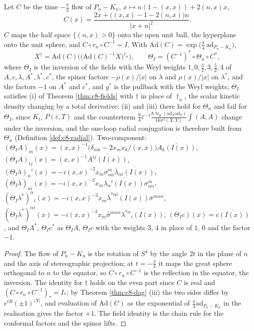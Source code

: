 \begin{proposition}
\label{prop:c8-C}
Let $C$ be the time $-\tfrac\pi4$ flow of $P_n-K_n$, $x\mapsto n(1-(x,x))+2(n,x)x$,
\[
C(x)=\frac{2x+\big((x,x)-1-2(n,x)\big)n}{|x+n|^2}.
\]
$C$ maps the half space $\{(n,x)>0\}$ onto the open unit ball, the hyperplane onto the unit sphere, and $C\circ r_n\circ C^{-1}=I$. With $\mathrm{Ad}(C)=\exp\big(\tfrac\pi4\,\mathrm{ad}_{P_n-K_n}\big)$,
\[
X^\dagger=\mathrm{Ad}(C)\Big(\big(\mathrm{Ad}(C)^{-1}X\big)^{\dagger_n}\Big),\qquad \Theta_I=(C^{-1})^*\circ\Theta_n\circ C^*,
\]
where $\Theta_I$ is the inversion of the fields with the Weyl weights $1,0,\tfrac32,3,\tfrac52,4$ of $A,c,\lambda,A^*,\lambda^*,c^*$, the spinor factors $-\rho(x)/|x|$ on $\lambda$ and $\rho(x)/|x|$ on $\lambda^*$, and the factors $-1$ on $A^*$ and $c^*$, and $g^*$ is the pullback with the Weyl weights; $\Theta_I$ satisfies (i) of Theorem \ref{thm:c8-fields} with $\dagger$ in place of $\dagger_n$, the scalar kinetic density changing by a total derivative; (ii) and (iii) there hold for $\Theta_n$ and fail for $\Theta_I$, since $K_t$, $P(\varepsilon,T)$ and the counterterm $\tfrac94\varepsilon^{-1}\frac{\hbar\operatorname{tr}_{\mathfrak g}(\mathrm{ad}_X\mathrm{ad}_Y)}{16\pi^2(X,Y)}\int(A,A)$ change under the inversion, and the one-loop radial conjugation is therefore built from $\Theta_n$ (Definition \ref{def:c8-radial}). Two-component: $(\Theta_IA)_m(x)=(x,x)^{-1}\big(\delta_{mk}-2x_mx_k/(x,x)\big)\overline{A_k(I(x))}$, $(\Theta_IA)_{ij}(x)=(x,x)^{-1}\overline{A^{ij}(I(x))}$, $(\Theta_I\lambda)_\alpha{}^i(x)=-i(x,x)^{-2}x_m\sigma^m_{\alpha\dot\alpha}\overline{\bar\lambda_{\dot\alpha i}(I(x))}$, $(\Theta_I\bar\lambda)_{\dot\alpha i}(x)=-i(x,x)^{-2}x_m\overline{\lambda_\alpha{}^i(I(x))}\sigma^m_{\alpha\dot\alpha}$, $(\Theta_I\lambda^*)^\alpha{}_i(x)=-i(x,x)^{-3}x_m\overline{\bar\lambda^{*\dot\alpha i}(I(x))}\bar\sigma^{m\dot\alpha\alpha}$, $(\Theta_I\bar\lambda^*)^{\dot\alpha i}(x)=-i(x,x)^{-3}x_m\bar\sigma^{m\dot\alpha\alpha}\overline{\lambda^{*\alpha}{}_i(I(x))}$, $(\Theta_Ic)(x)=\overline{c(I(x))}$, and $\Theta_IA^*$, $\Theta_Ic^*$ as $\Theta_IA$, $\Theta_Ic$ with the weights $3$, $4$ in place of $1$, $0$ and the factor $-1$.
\end{proposition}

\begin{proof}
The flow of $P_n-K_n$ is the rotation of $S^4$ by the angle $2t$ in the plane of $n$ and the axis of stereographic projection; at $t=-\tfrac\pi4$ it maps the great sphere orthogonal to $n$ to the equator, so $C\circ r_n\circ C^{-1}$ is the reflection in the equator, the inversion. The identity for $\dagger$ holds on the even part since $C$ is real and $(C\circ r_n\circ C^{-1})_*=I_*$; by Theorem \ref{thm:c8-dag} (iii) the two sides differ by $e^{tB}(\pm1)^{|X|}$, and evaluation of $\mathrm{Ad}(C)$ as the exponential of $\tfrac\pi4\mathrm{ad}_{P_n-K_n}$ in the realisation gives the factor $+1$. The field identity is the chain rule for the conformal factors and the spinor lifts.
\end{proof}

